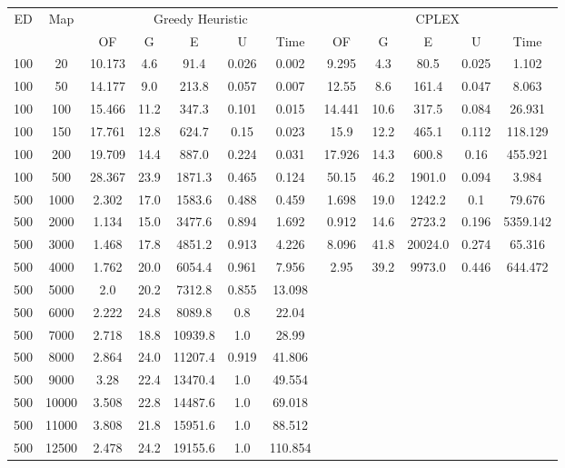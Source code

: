 \begin{table}[htb]
	\centering
	\begin{tabular}{|c|c|c|c|c|c|c|c|c|c|c|c|}
		\hline
		\multirow{2}{*}{ED} & \multirow{2}{*}{Map} & \multicolumn{5}{c|}{Greedy Heuristic} & \multicolumn{5}{c|}{CPLEX}\\ 
		\cline{3-12}
&& OF & G & E & U & Time & OF & G & E & U & Time\\ 
		\hline
		100 & 20 & 10.173 & 4.6 & 91.4 & 0.026 & 0.002 & 9.295 & 4.3 & 80.5 & 0.025 & 1.102 \\ 
		100 & 50 & 14.177 & 9.0 & 213.8 & 0.057 & 0.007 & 12.55 & 8.6 & 161.4 & 0.047 & 8.063 \\ 
		100 & 100 & 15.466 & 11.2 & 347.3 & 0.101 & 0.015 & 14.441 & 10.6 & 317.5 & 0.084 & 26.931 \\ 
		100 & 150 & 17.761 & 12.8 & 624.7 & 0.15 & 0.023 & 15.9 & 12.2 & 465.1 & 0.112 & 118.129 \\ 
		100 & 200 & 19.709 & 14.4 & 887.0 & 0.224 & 0.031 & 17.926 & 14.3 & 600.8 & 0.16 & 455.921 \\ 
		100 & 500 & 28.367 & 23.9 & 1871.3 & 0.465 & 0.124 & 50.15 & 46.2 & 1901.0 & 0.094 & 3.984 \\ 
		500 & 1000 & 2.302 & 17.0 & 1583.6 & 0.488 & 0.459 & 1.698 & 19.0 & 1242.2 & 0.1 & 79.676 \\ 
		500 & 2000 & 1.134 & 15.0 & 3477.6 & 0.894 & 1.692 & 0.912 & 14.6 & 2723.2 & 0.196 & 5359.142 \\ 
		500 & 3000 & 1.468 & 17.8 & 4851.2 & 0.913 & 4.226 & 8.096 & 41.8 & 20024.0 & 0.274 & 65.316 \\ 
		500 & 4000 & 1.762 & 20.0 & 6054.4 & 0.961 & 7.956 & 2.95 & 39.2 & 9973.0 & 0.446 & 644.472 \\ 
		500 & 5000 & 2.0 & 20.2 & 7312.8 & 0.855 & 13.098 & & & & &  \\ 
		500 & 6000 & 2.222 & 24.8 & 8089.8 & 0.8 & 22.04 & & & & &  \\ 
		500 & 7000 & 2.718 & 18.8 & 10939.8 & 1.0 & 28.99 & & & & &  \\ 
		500 & 8000 & 2.864 & 24.0 & 11207.4 & 0.919 & 41.806 & & & & &  \\ 
		500 & 9000 & 3.28 & 22.4 & 13470.4 & 1.0 & 49.554 & & & & &  \\ 
		500 & 10000 & 3.508 & 22.8 & 14487.6 & 1.0 & 69.018 & & & & &  \\ 
		500 & 11000 & 3.808 & 21.8 & 15951.6 & 1.0 & 88.512 & & & & &  \\ 
		500 & 12500 & 2.478 & 24.2 & 19155.6 & 1.0 & 110.854 & & & & &  \\ 

\end{tabular}
\end{table}
